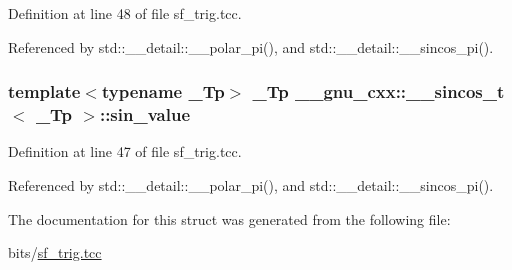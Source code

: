 Definition at line 48 of file sf\+\_\+trig.\+tcc.



Referenced by std\+::\+\_\+\+\_\+detail\+::\+\_\+\+\_\+polar\+\_\+pi(), and std\+::\+\_\+\+\_\+detail\+::\+\_\+\+\_\+sincos\+\_\+pi().

\subsubsection[{\texorpdfstring{sin\+\_\+value}{sin_value}}]{\setlength{\rightskip}{0pt plus 5cm}template$<$typename \+\_\+\+Tp$>$ \+\_\+\+Tp {\bf \+\_\+\+\_\+gnu\+\_\+cxx\+::\+\_\+\+\_\+sincos\+\_\+t}$<$ \+\_\+\+Tp $>$\+::sin\+\_\+value}\hypertarget{struct____gnu__cxx_1_1____sincos__t_aeff58997312089a3abd6b71abe722fc8}{}\label{struct____gnu__cxx_1_1____sincos__t_aeff58997312089a3abd6b71abe722fc8}


Definition at line 47 of file sf\+\_\+trig.\+tcc.



Referenced by std\+::\+\_\+\+\_\+detail\+::\+\_\+\+\_\+polar\+\_\+pi(), and std\+::\+\_\+\+\_\+detail\+::\+\_\+\+\_\+sincos\+\_\+pi().



The documentation for this struct was generated from the following file\+:\begin{DoxyCompactItemize}
\item 
bits/\hyperlink{sf__trig_8tcc}{sf\+\_\+trig.\+tcc}\end{DoxyCompactItemize}
